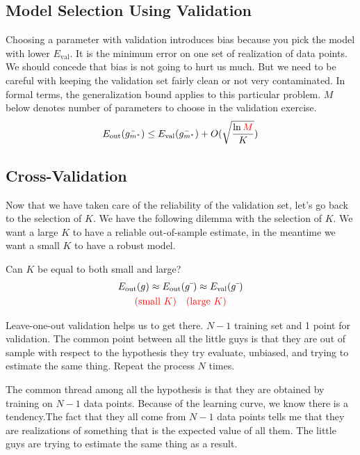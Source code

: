 \documentclass[10pt]{article}
\numberwithin{equation}{section}  %
\begin{document}

\subsection{Model Selection Using Validation}

Choosing a parameter with validation introduces bias because you pick the model with lower $E_\mathrm{val}$. It is the minimum error on one set of realization of data points. We should concede that bias is not going to hurt us much. But we need to be careful with keeping the validation set fairly clean or not very contaminated.
In formal terms, the generalization bound applies to this particular problem. $M$ below denotes number of parameters to choose in the validation exercise.
\begin{equation}
    E_\mathrm{out}(\bar{g_{m^*}}) \leq E_\mathrm{val}(\bar{g_{m^*}}) + O\large(\sqrt{\frac{\ln\textcolor{red}{M}}{K}}\large)
\end{equation}

\subsection{Cross-Validation}

Now that we have taken care of the reliability of the validation set, let's go back to the selection of $K$. We have the following dilemma with the selection of $K$. We want a large $K$ to have a reliable out-of-sample estimate, in the meantime we want a small $K$ to have a robust model.

Can $K$ be equal to both small and large?
\begin{gather*}
    E_\mathrm{out}(g) \approx E_\mathrm{out}(g\bar{\ }) \approx E_\mathrm{val}(g\bar{\ }) \\
    \textcolor{red}{(\text{small}\ K)\ \ \ (\text{large}\ K)}
\end{gather*}

Leave-one-out validation helps us to get there.
$N-1$ training set and 1 point for validation. The common point between all the little guys is that they are out of sample with respect to the hypothesis they try evaluate, unbiased, and trying to estimate the same thing. Repeat the process $N$ times.

The common thread among all the hypothesis is that they are obtained by training on $N-1$ data points. Because of the learning curve, we know there is a tendency.The fact that they all come from $N-1$ data points tells me that they are realizations of something that is the expected value of all them. The little guys are trying to estimate the same thing as a result.
\end{document}
